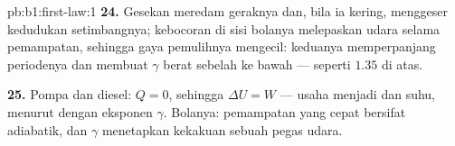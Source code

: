 \begin{solution}{pb:b1:first-law:1}
\textbf{24.} Gesekan meredam geraknya dan, bila ia kering, menggeser
kedudukan setimbangnya; kebocoran di sisi bolanya melepaskan udara selama pemampatan,
sehingga gaya pemulihnya mengecil: keduanya memperpanjang periodenya dan membuat
$\gamma$ berat sebelah ke bawah --- seperti $1.35$ di atas.

\textbf{25.} Pompa dan diesel: $Q = 0$, sehingga $\Delta U = W$ --- usaha menjadi
 dan suhu, menurut  dengan eksponen
$\gamma$. Bolanya: pemampatan yang cepat bersifat adiabatik, dan $\gamma$ menetapkan
kekakuan sebuah pegas udara.
\end{solution}
